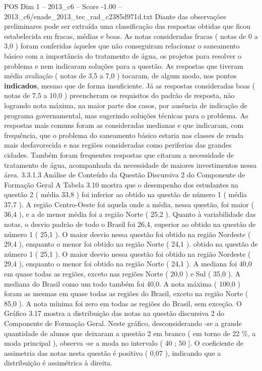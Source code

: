 \begin{textsample}{POS Dim 1 – 2013\_c6 – Score -1.00 – 2013\_c6/enade\_2013\_tec\_rad\_c2385d971d.txt}
Diante das observações preliminares pode ser extraída uma classificação das respostas obtidas que ficou estabelecida em fracas, médias e boas.
As notas consideradas fracas ( notas de 0 a 3,0 ) foram conferidas àqueles que não conseguiram relacionar o saneamento básico com a importância do tratamento de água, os projetos para resolver o problema e nem indicaram soluções para a questão.
As respostas que tiveram média avaliação ( notas de 3,5 a 7,0 ) tocaram, de algum modo, nos pontos \textbf{indicados}, mesmo que de forma insuficiente.
Já as respostas consideradas boas ( notas de 7,5 a 10,0 ) preencheram os requisitos do padrão de resposta, não logrando nota máxima, na maior parte dos casos, por ausência de indicação de programa governamental, mas sugerindo soluções técnicas para o problema.
As respostas mais comuns foram as consideradas medianas e que indicaram, com frequência, que o problema do saneamento básico estaria nas classes de renda mais desfavorecida e nas regiões consideradas como periferias das grandes cidades.
Também foram frequentes respostas que citaram a necessidade de tratamento de água, acompanhada da necessidade de maiores investimentos nessa área. 3.3.1.3 Análise de Conteúdo da Questão Discursiva 2 do Componente de Formação Geral A Tabela 3.10 mostra que o desempenho dos estudantes na questão 2 ( média 33,8 ) foi inferior ao obtido na questão de número 1 ( média 37,7 ).
A região Centro-Oeste foi aquela onde a média, nessa questão, foi maior ( 36,4 ), e a de menor média foi a região Norte ( 25,2 ).
Quanto à variabilidade das notas, o desvio padrão de todo o Brasil foi 26,4, superior ao obtido na questão de número 1 ( 25,1 ).
O maior desvio nessa questão foi obtido na região Nordeste ( 29,4 ), enquanto o menor foi obtido na região Norte ( 24,1 ). obtido na questão de número 1 ( 25,1 ).
O maior desvio nessa questão foi obtido na região Nordeste ( 29,4 ), enquanto o menor foi obtido na região Norte ( 24,1 ).
A mediana foi 40,0 em quase todas as regiões, exceto nas regiões Norte ( 20,0 ) e Sul ( 35,0 ).
A mediana do Brasil como um todo também foi 40,0.
A nota máxima ( 100,0 ) foram as mesmas em quase todas as regiões do Brasil, exceto na região Norte ( 85,0 ).
A nota mínima foi zero em todas as regiões do Brasil, sem exceção.
O Gráfico 3.17 mostra a distribuição das notas na questão discursiva 2 do Componente de Formação Geral.
Neste gráfico, desconsiderando -se a grande quantidade de alunos que deixaram a questão 2 em branco ( em torno de 22 \%, a moda principal ), observa -se a moda no intervalo ( 40 ; 50 ].
O coeficiente de assimetria das notas nesta questão é positivo ( 0,07 ), indicando que a distribuição é assimétrica à direita.

\end{textsample}
